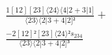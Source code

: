 \documentclass[varwidth, border=5pt]{standalone}
\begin{document}
\begin{my}
$\begin{gathered}
\scriptscriptstyle\frac{1[12][23]⟨24⟩⟨4|2+3|1]}{⟨23⟩⟨2|3+4|2]²} +\\
\scriptscriptstyle\frac{-2[12]²[23]⟨24⟩²s_{234}}{⟨23⟩⟨2|3+4|2]³} \phantom{+}
\end{gathered}$
\end{my}
\end{document}
